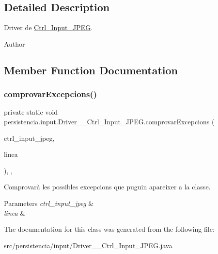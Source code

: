 \subsection{Detailed Description}
Driver de \hyperlink{classpersistencia_1_1input_1_1Ctrl__Input__JPEG}{Ctrl\+\_\+\+Input\+\_\+\+J\+P\+EG}. 

\begin{DoxyAuthor}{Author}

\end{DoxyAuthor}


\subsection{Member Function Documentation}
\mbox{\label{classpersistencia_1_1input_1_1Driver____Ctrl__Input__JPEG_ad40099d3188e58f93a2a57c4277b754e}} 
\subsubsection{\texorpdfstring{comprovar\+Excepcions()}{comprovarExcepcions()}}
{\footnotesize\ttfamily private static void persistencia.\+input.\+Driver\+\_\+\+\_\+\+Ctrl\+\_\+\+Input\+\_\+\+J\+P\+E\+G.\+comprovar\+Excepcions (\begin{DoxyParamCaption}\item[{\hyperlink{classpersistencia_1_1input_1_1Ctrl__Input__JPEG}{Ctrl\+\_\+\+Input\+\_\+\+J\+P\+EG}}]{ctrl\+\_\+input\+\_\+jpeg,  }\item[{String}]{linea }\end{DoxyParamCaption})\hspace{0.3cm}{\ttfamily [inline]}, {\ttfamily [static]}, {\ttfamily [private]}}



Comprovarà les possibles excepcions que puguin apareixer a la classe. 


\begin{DoxyParams}{Parameters}
{\em ctrl\+\_\+input\+\_\+jpeg} & \\
\hline
{\em linea} & \\
\hline
\end{DoxyParams}


The documentation for this class was generated from the following file\+:\begin{DoxyCompactItemize}
\item 
src/persistencia/input/Driver\+\_\+\+\_\+\+Ctrl\+\_\+\+Input\+\_\+\+J\+P\+E\+G.\+java\end{DoxyCompactItemize}
